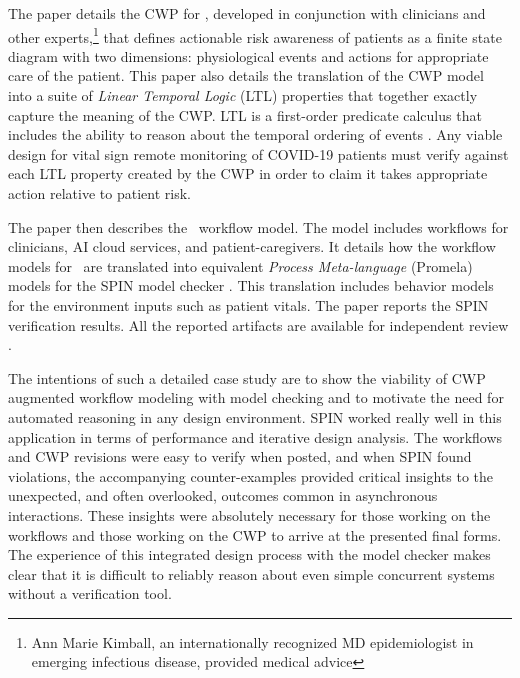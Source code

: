 The paper details the CWP for \phware, developed in conjunction with clinicians and other experts,\footnote{Ann Marie Kimball, an internationally recognized MD epidemiologist in emerging infectious disease, provided medical advice} that defines actionable risk awareness of patients as a finite state diagram with two dimensions: physiological events and actions for appropriate care of the patient.
This paper also details the translation of the CWP model into a suite of \emph{Linear Temporal Logic} (LTL) properties that together exactly capture the meaning of the CWP.
LTL is a first-order predicate calculus that includes the ability to reason about the temporal ordering of events \cite{10.5555/975331}.
Any viable design for vital sign remote monitoring of COVID-19 patients must verify against each LTL property created by the CWP in order to claim it takes appropriate action relative to patient risk.

The paper then describes the \phware\ workflow model.
The model includes workflows for clinicians, AI cloud services, and patient-caregivers.
It details how the workflow models for \phware\ are translated into equivalent \emph{Process Meta-language} (Promela) models for the SPIN model checker \cite{spin}.
This translation includes behavior models for the environment inputs such as patient vitals.
The paper reports the SPIN verification results.
All the reported artifacts are available for independent review \cite{repo}.

The intentions of such a detailed case study are to show the viability of CWP augmented workflow modeling with model checking and to motivate the need for automated reasoning in any design environment.
SPIN worked really well in this application in terms of performance and iterative design analysis.
The workflows and CWP revisions were easy to verify when posted, and when SPIN found violations, the accompanying counter-examples provided critical insights to the unexpected, and often overlooked, outcomes common in asynchronous interactions.
These insights were absolutely necessary for those working on the workflows and those working on the CWP to arrive at the presented final forms.
The experience of this integrated design process with the model checker makes clear that it is difficult to reliably reason about even simple concurrent systems without a verification tool.
